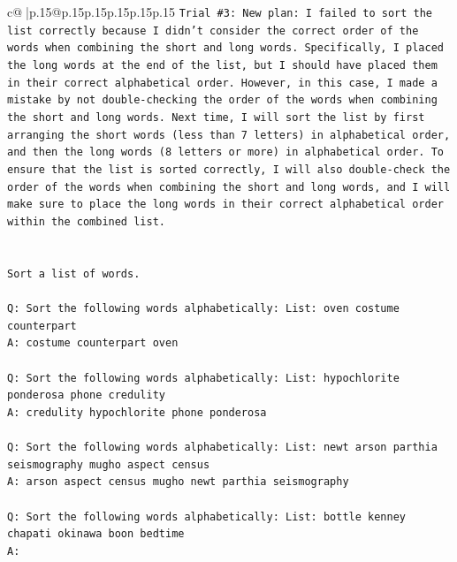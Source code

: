 \documentclass{article}
\begin{document}
{\begin{supertabular}{c@{$\;$}|p{.15\linewidth}@{}p{.15\linewidth}p{.15\linewidth}p{.15\linewidth}p{.15\linewidth}p{.15\linewidth}}
{{{\texttt{Trial \#3: New plan: I failed to sort the list correctly because I didn't consider the correct order of the words when combining the short and long words. Specifically, I placed the long words at the end of the list, but I should have placed them in their correct alphabetical order. However, in this case, I made a mistake by not double{-}checking the order of the words when combining the short and long words. Next time, I will sort the list by first arranging the short words (less than 7 letters) in alphabetical order, and then the long words (8 letters or more) in alphabetical order. To ensure that the list is sorted correctly, I will also double{-}check the order of the words when combining the short and long words, and I will make sure to place the long words in their correct alphabetical order within the combined list.} \\
\\ 
\\ 
\texttt{Sort a list of words.} \\
\\ 
\texttt{Q: Sort the following words alphabetically: List: oven costume counterpart} \\
\texttt{A: costume counterpart oven} \\
\\ 
\texttt{Q: Sort the following words alphabetically: List: hypochlorite ponderosa phone credulity} \\
\texttt{A: credulity hypochlorite phone ponderosa} \\
\\ 
\texttt{Q: Sort the following words alphabetically: List: newt arson parthia seismography mugho aspect census} \\
\texttt{A: arson aspect census mugho newt parthia seismography} \\
\\ 
\texttt{Q: Sort the following words alphabetically: List: bottle kenney chapati okinawa boon bedtime} \\
\texttt{A:} \\
            }
        }
    }
     \\ \\


\end{supertabular}}
\end{document}
